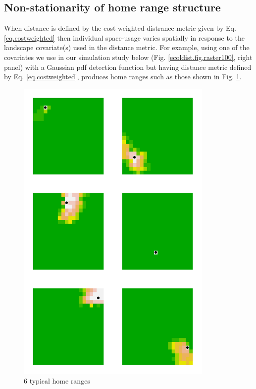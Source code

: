 \documentclass[12pt]{article}
\begin{document}
\subsection{Non-stationarity of home range structure}

When distance is defined by the cost-weighted distrance metric given
by Eq. \ref{eq.costweighted} then individual space-usage varies
spatially in response to the landscape covariate(s) used in the
distance metric. For example, using one of the covariates we use in
our simulation study below (Fig. \ref{ecoldist.fig.raster100}, right
panel) with a Gaussian pdf detection function but having distance
metric defined by Eq. \ref{eq.costweighted}, produces home ranges such
as those shown in Fig. \ref{fig.homeranges}.

\begin{figure}
\begin{center}
\includegraphics[height=6in,width=3.75in]{figs/home_ranges}
\end{center}
\caption{6 typical home ranges}
\label{fig.homeranges}
\end{figure}
\end{document}
